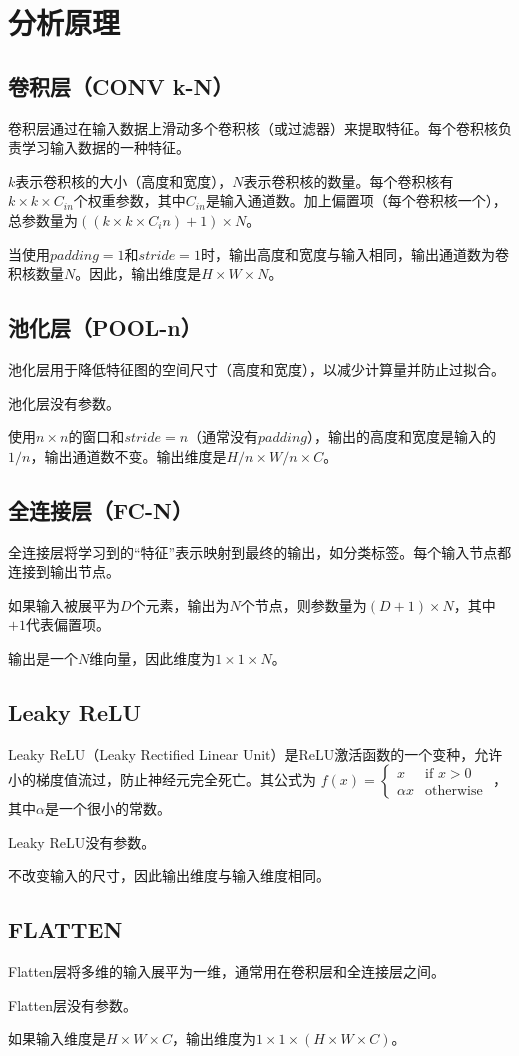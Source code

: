 \section{分析原理}\label{sec:theory}

\subsection{卷积层（CONV k-N）}

卷积层通过在输入数据上滑动多个卷积核（或过滤器）来提取特征。每个卷积核负责学习输入数据的一种特征。

$k$表示卷积核的大小（高度和宽度），$N$表示卷积核的数量。每个卷积核有$k \times k \times C_{in}$个权重参数，其中$C_{in}$是输入通道数。加上偏置项（每个卷积核一个），总参数量为$((k \times k \times C_in)+1) \times N$。

当使用$padding=1$和$stride=1$时，输出高度和宽度与输入相同，输出通道数为卷积核数量$N$。因此，输出维度是$H \times W \times N$。

\subsection{池化层（POOL-n）}

池化层用于降低特征图的空间尺寸（高度和宽度），以减少计算量并防止过拟合。

池化层没有参数。

使用$n \times n$的窗口和$stride=n$（通常没有$padding$），输出的高度和宽度是输入的$1/n$，输出通道数不变。输出维度是$H/n \times W/n \times C$。

\subsection{全连接层（FC-N）}

全连接层将学习到的“特征”表示映射到最终的输出，如分类标签。每个输入节点都连接到输出节点。

如果输入被展平为$D$个元素，输出为$N$个节点，则参数量为$(D+1) \times N$，其中$+1$代表偏置项。

输出是一个$N$维向量，因此维度为$1 \times 1 \times N$。

\subsection{Leaky ReLU}

Leaky ReLU（Leaky Rectified Linear Unit）是ReLU激活函数的一个变种，允许小的梯度值流过，防止神经元完全死亡。其公式为
$
f(x) = \begin{cases} 
	x & \text{if } x > 0 \\
	\alpha x & \text{otherwise}
\end{cases}
$
，其中$\alpha$是一个很小的常数。

Leaky ReLU没有参数。

不改变输入的尺寸，因此输出维度与输入维度相同。

\subsection{FLATTEN}

Flatten层将多维的输入展平为一维，通常用在卷积层和全连接层之间。

Flatten层没有参数。

如果输入维度是$H \times W \times C$，输出维度为$1 \times 1 \times (H \times W \times C)$。